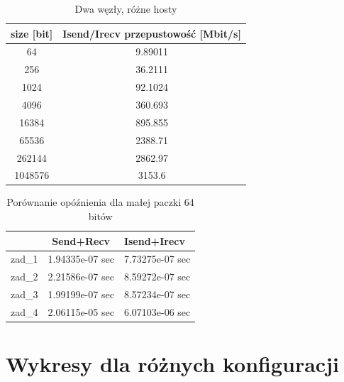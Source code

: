 \documentclass[10pt,english, openany]{book}
\begin{document}
\begin{table}[H]
\caption{Dwa węzły, różne hosty}
\begin{center}
\begin{tabular}{|c|c|}
\hline
size {[}bit{]} & Isend/Irecv przepustowość {[}Mbit/s{]} \\ \hline
64           & 9.89011                                \\ \hline
256          & 36.2111                                \\ \hline
1024         & 92.1024                                \\ \hline
4096         & 360.693                                \\ \hline
16384        & 895.855                                \\ \hline
65536        & 2388.71                                \\ \hline
262144       & 2862.97                                \\ \hline
1048576      & 3153.6                                 \\ \hline
\end{tabular}
\end{center}
\end{table}

\begin{table}[H]
\caption{Porównanie opóźnienia dla małej paczki 64 bitów}
\begin{center}
\begin{tabular}{|c|c|l|}
\hline
       & Send+Recv       & Isend+Irecv     \\ \hline
zad\_1 & 1.94335e-07 sec & 7.73275e-07 sec \\ \hline
zad\_2 & 2.21586e-07 sec & 8.59272e-07 sec \\ \hline
zad\_3 & 1.99199e-07 sec & 8.57234e-07 sec \\ \hline
zad\_4 & 2.06115e-05 sec & 6.07103e-06 sec \\ \hline
\end{tabular}
\end{center}
\end{table}

\chapter{Wykresy dla różnych konfiguracji}
\end{document}
